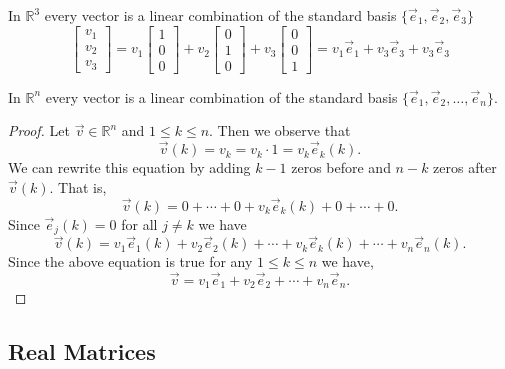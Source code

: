 \begin{example}
In $\mathbb{R}^3 $ every vector is a linear combination of the standard basis 
$\{\vec{e}_1,\vec{e}_2,\vec{e}_3\}$
\[
\begin{bmatrix}v_1 \\ v_2 \\ v_3\end{bmatrix}=
v_1 \begin{bmatrix}1 \\ 0 \\ 0\end{bmatrix}+
v_2 \begin{bmatrix}0 \\ 1 \\ 0\end{bmatrix}+
v_3 \begin{bmatrix}0 \\ 0 \\ 1\end{bmatrix}
=v_1\vec{e}_1+v_3\vec{e}_3+v_3\vec{e}_3
\]
\end{example}

\begin{proposition}\label{prop:e_k_spans_Rn}
In $\mathbb{R}^n$ every vector is a linear combination of the standard basis 
$\{\vec{e}_1, \vec{e}_2, \ldots, \vec{e}_n\}$.
\end{proposition}

\begin{proof}
Let $\vec{v} \in \mathbb{R}^n$ and $1\leq k\leq n$. Then we observe that  
\[\vec{v}(k)=v_k=v_k\cdot 1=v_k \vec{e}_k(k).\]
We can rewrite this equation by adding $k-1$ zeros before and $n-k$ zeros 
after $\vec{v}(k)$. That is,  
\[\vec{v}(k)=0+ \cdots + 0+v_k\vec{e}_k(k)+0+\cdots+0.\] 
Since $\vec{e}_j(k)=0$ for all $j\neq k$ we have 
\[\vec{v}(k)=v_1\vec{e}_1(k)+v_2\vec{e}_2(k)+\cdots+ v_k\vec{e}_k(k)+ \cdots + 
v_n\vec{e}_n(k).\]
Since the above equation is true for any $1\leq k\leq n$ we have,  
\[\vec{v}=v_1\vec{e}_1+v_2\vec{e}_2+\cdots+ v_n\vec{e}_n.\]
\end{proof}



\subsection{Real Matrices}

